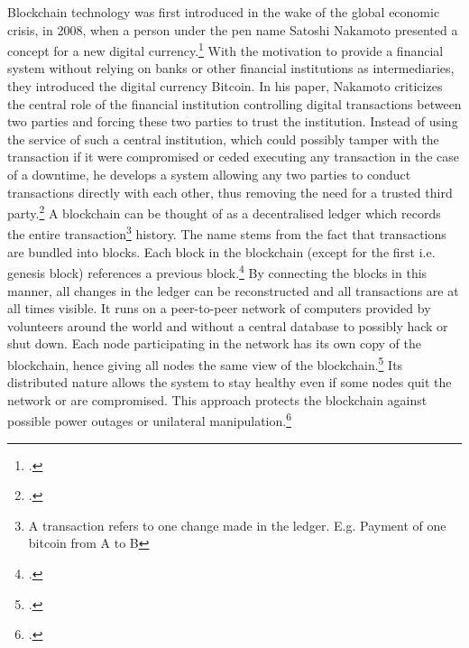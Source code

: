 Blockchain technology was first introduced in the wake of the global economic crisis, in 2008, when a person under the pen name Satoshi Nakamoto presented a concept for a new digital currency.\footcite[Cf.][]{Nakamoto.2008} With the motivation to provide a financial system without relying on banks or other financial institutions as intermediaries, they introduced the digital currency Bitcoin. In his paper, Nakamoto criticizes the central role of the financial institution controlling digital transactions between two parties and forcing these two parties to trust the institution. Instead of using the service of such a central institution, which could possibly tamper with the transaction if it were compromised or ceded executing any transaction in the case of a downtime, he develops a system allowing any two parties to conduct transactions directly with each other, thus removing the need for a trusted third party.\footcite[Cf.][p.2]{Nakamoto.2008} A blockchain can be thought of as a decentralised ledger which records the entire transaction\footnote{A transaction refers to one change made in the ledger. E.g. Payment of one bitcoin from A to B} history. The name stems from the fact that transactions are bundled into blocks. Each block in the blockchain (except for the first i.e. genesis block) references a previous block.\footcite[Cf.][chapter 1]{BashirMasteringBlockchain2017} By connecting the blocks in this manner, all changes in the ledger can be reconstructed and all transactions are at all times visible. It runs on a peer-to-peer network of computers provided by volunteers around the world and without a central database to possibly hack or shut down. Each node participating in the network has its own copy of the blockchain, hence giving all nodes the same view of the blockchain.\footcites[Cf.][p.5]{Tapscott.2017}[cf.][p.41]{Welzel.2017} Its distributed nature allows the system to stay healthy even if some nodes quit the network or are compromised. This approach protects the blockchain against possible power outages or unilateral manipulation.\footcite[Cf.][p.8]{Nakamoto.2008}

